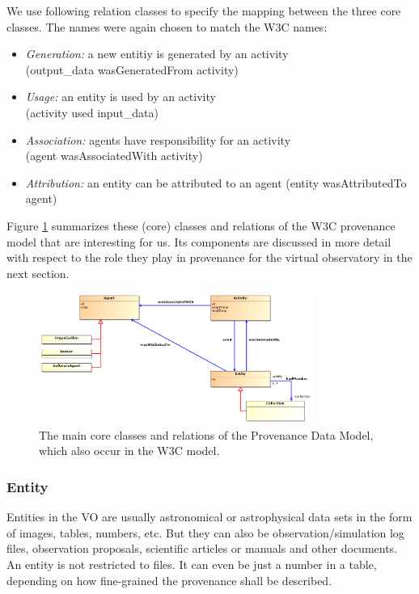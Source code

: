 \noindent

We use following relation classes to specify the mapping between the three core 
classes. The names were again chosen to match the W3C names:
\begin{itemize}
\item \emph{Generation:} a new entitiy is generated by an activity\\
        (output\_data wasGeneratedFrom activity)
\item \emph{Usage:} an entity is used by an activity\\
        (activity used input\_data)
\item \emph{Association:} agents have responsibility for an activity\\
        (agent wasAssociatedWith activity)
\item \emph{Attribution:} an entity can be attributed to an agent (entity wasAttributedTo agent)
\end{itemize}

Figure \ref{fig:coreclasses} summarizes these (core) classes and relations of the W3C provenance model that are interesting for us.
Its components are discussed in more detail with respect to the role they play in provenance for the virtual observatory in the next section.

\begin{figure}
\centering
\includegraphics[width=0.8\textwidth]{ProvDM-W3C-classdiagram.png}
\caption{The main core classes and relations of the Provenance Data Model, which also occur in the W3C model.}
\label{fig:coreclasses}
\end{figure}




\subsubsection{Entity}
Entities in the VO are usually astronomical or astrophysical data sets in the form of images, tables, numbers, etc. But they can also be observation/simulation log files, observation proposals, scientific articles or manuals and other documents. An entity is not restricted to files. It can even be just a number in a table, depending on how fine-grained the provenance shall be described.

